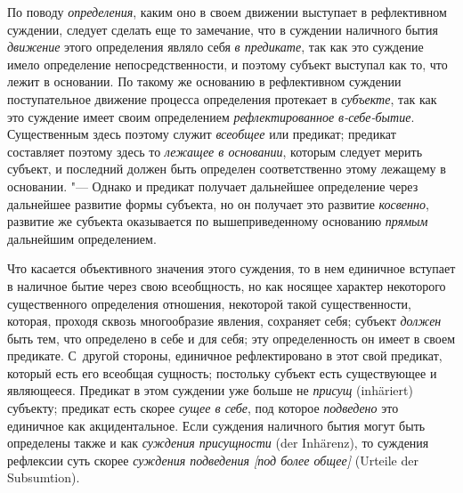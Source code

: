 По поводу
{\em определения}, каким
оно в своем движении выступает в рефлективном суждении, следует сделать еще
то замечание, что в суждении наличного бытия
{\em движение} этого определения являло себя {\em в предикате},
так как это суждение имело определение
непосредственности, и поэтому субъект выступал как то, что лежит в
основании. По такому же основанию в рефлективном суждении
поступательное движение процесса определения протекает в
{\em субъекте}, так как
это суждение имеет своим определением
{\em рефлектированное в-себе-бытие}.
Существенным здесь поэтому служит
{\em всеобщее} или
предикат; предикат составляет поэтому здесь то
{\em лежащее в основании},
которым следует мерить субъект, и последний должен быть
определен соответственно этому лежащему в основании. "---
Однако и предикат получает дальнейшее определение через
дальнейшее развитие формы субъекта, но он получает это развитие
{\em косвенно}, развитие
же субъекта оказывается по вышеприведенному основанию
{\em прямым} дальнейшим определением.

Что касается объективного значения этого суждения, то в нем
единичное вступает в наличное бытие через свою всеобщность, но как носящее
характер некоторого существенного определения отношения, некоторой такой
существенности, которая, проходя сквозь многообразие явления, сохраняет
себя; субъект {\em должен}
быть тем, что определено в себе и для себя; эту
определенность он имеет в своем предикате. С~другой стороны, единичное
рефлектировано в этот свой предикат, который есть его всеобщая сущность;
постольку субъект есть существующее и являющееся. Предикат в этом суждении
уже больше не {\em присущ} (inhäriert) субъекту; предикат есть скорее
{\em сущее в себе}, под которое {\em подведено}
это единичное как акцидентальное. Если суждения наличного
бытия могут быть определены также и как
{\em суждения присущности} (der
Inhärenz), то суждения рефлексии суть скорее
{\em суждения подведения [под более общее]} (Urteile der Subsumtion).


